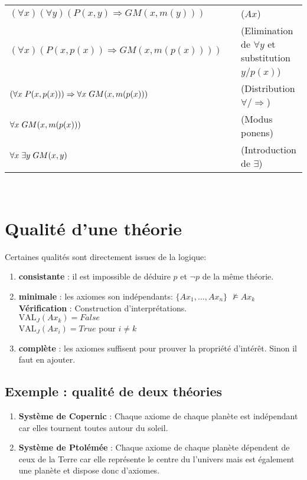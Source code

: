 \begin{tabular}{lll}
$(\forall x)(\forall y) \left(P(x,y)\Rightarrow GM(x, m(y)) \right)$&\hspace*{1cm}&($Ax$)\\
$(\forall x) \left(P(x,p(x))\Rightarrow GM(x, m(p(x))) \right)$&\hspace*{1cm}&(Elimination de $\forall y$ et substitution $y/p(x)$)\\
$\left( \forall x \hspace*{0.1cm} P(x,p(x)) \right)\Rightarrow \forall x \hspace*{0.1cm} GM(x,m(p(x)))$&\hspace*{1cm}&(Distribution $\forall/\Rightarrow$)\\
$\forall x \hspace*{0.1cm} GM(x,m(p(x)))$&\hspace*{1cm}&(Modus ponens)\\
$\forall x \hspace*{0.1cm} \exists y \hspace*{0.1cm} GM(x,y)$&\hspace*{1cm}&(Introduction de $\exists$)\\
\end{tabular}\\

\chapter*{Qualité d'une théorie}
Certaines qualités sont directement issues de la logique:
\begin {enumerate}
\item {\textbf{consistante}} : il est impossible de déduire \(p\) et \(\neg p\)  de la même théorie.
\item {\textbf{minimale}} : les axiomes son indépendants: 
$\{Ax_1, \hdots, Ax_n\}$   $\nvDash Ax_k $\\
\textbf{Vérification} : Construction d'interprétations.\\
$\text{VAL}_J (Ax_k)= False$\\
$\text{VAL}_J (Ax_i)= True$  
pour $i \neq k$
\item {\textbf{complète}} : les axiomes suffisent pour prouver la propriété d'intérêt. Sinon il faut en ajouter.
\end {enumerate}
\section*{Exemple : qualité de deux théories}
\begin {enumerate}
\item {\textbf{Système de Copernic}} : Chaque axiome de chaque planète est indépendant car elles tournent toutes autour du soleil.
\item{\textbf{Système de Ptolémée}} : Chaque axiome de chaque planète dépendent de ceux de la Terre car elle représente le centre du l'univers mais est également une planète et dispose donc d'axiomes.
\end {enumerate}
